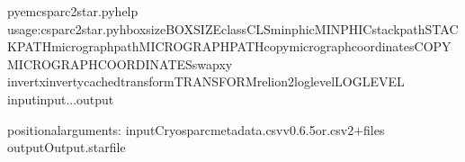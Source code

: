 \documentclass[a4paper,11pt,english]{sphinxmanual}
\begin{document}
\begin{sphinxVerbatim}[commandchars=\\\{\}]
pyem\PYGZdl{}\PYGZgt{}csparc2star.py\PYGZhy{}\PYGZhy{}help
usage:csparc2star.py\PYG{o}{[}\PYGZhy{}h\PYG{o}{]}\PYG{o}{[}\PYGZhy{}\PYGZhy{}boxsizeBOXSIZE\PYG{o}{]}\PYG{o}{[}\PYGZhy{}\PYGZhy{}classCLS\PYG{o}{]}\PYG{o}{[}\PYGZhy{}\PYGZhy{}minphicMINPHIC\PYG{o}{]}\PYG{o}{[}\PYGZhy{}\PYGZhy{}stack\PYGZhy{}pathSTACK\PYGZus{}PATH\PYG{o}{]}\PYG{o}{[}\PYGZhy{}\PYGZhy{}micrograph\PYGZhy{}pathMICROGRAPH\PYGZus{}PATH\PYG{o}{]}\PYG{o}{[}\PYGZhy{}\PYGZhy{}copy\PYGZhy{}micrograph\PYGZhy{}coordinatesCOPY\PYGZus{}MICROGRAPH\PYGZus{}COORDINATES\PYG{o}{]}\PYG{o}{[}\PYGZhy{}\PYGZhy{}swapxy\PYG{o}{]}
\PYG{o}{[}\PYGZhy{}\PYGZhy{}invertx\PYG{o}{]}\PYG{o}{[}\PYGZhy{}\PYGZhy{}inverty\PYG{o}{]}\PYG{o}{[}\PYGZhy{}\PYGZhy{}cached\PYG{o}{]}\PYG{o}{[}\PYGZhy{}\PYGZhy{}transformTRANSFORM\PYG{o}{]}\PYG{o}{[}\PYGZhy{}\PYGZhy{}relion2\PYG{o}{]}\PYG{o}{[}\PYGZhy{}\PYGZhy{}loglevelLOGLEVEL\PYG{o}{]}
\PYG{o}{[}input\PYG{o}{[}input...\PYG{o}{]}\PYG{o}{]}output

positionalarguments:
inputCryosparcmetadata.csvv0.6.5or.csv2+files
outputOutput.starfile


\end{sphinxVerbatim}
\end{document}
